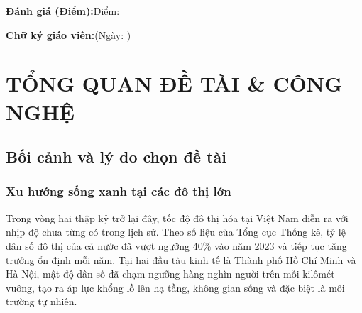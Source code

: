 \documentclass[11pt, a4paper]{article}
\let\oldsection\section
\renewcommand{\section}{\FloatBarrier\oldsection}
\begin{document}
\noindent\dotfill

\noindent\dotfill

\noindent\dotfill

\noindent\dotfill

\noindent\dotfill

\noindent\dotfill

\noindent\dotfill

\vspace{1cm}

\noindent\textbf{Đánh giá (Điểm):}\hspace{2cm}Điểm:\hspace{1cm}\dotfill

\vspace{0.5cm}

\noindent\textbf{Chữ ký giáo viên:}\hspace{2cm}\dotfill\hspace{2cm}(Ngày: \dotfill)

\clearpage

\renewcommand{\contentsname}{MỤC LỤC}
\tableofcontents

\clearpage

\section{TỔNG QUAN ĐỀ TÀI \& CÔNG NGHỆ}

\subsection{Bối cảnh và lý do chọn đề tài}

\subsubsection{Xu hướng sống xanh tại các đô thị lớn}

Trong vòng hai thập kỷ trở lại đây, tốc độ đô thị hóa tại Việt Nam diễn ra với nhịp độ chưa từng có trong lịch sử. Theo số liệu của Tổng cục Thống kê, tỷ lệ dân số đô thị của cả nước đã vượt ngưỡng 40\% vào năm 2023 và tiếp tục tăng trưởng ổn định mỗi năm. Tại hai đầu tàu kinh tế là Thành phố Hồ Chí Minh và Hà Nội, mật độ dân số đã chạm ngưỡng hàng nghìn người trên mỗi kilômét vuông, tạo ra áp lực khổng lồ lên hạ tầng, không gian sống và đặc biệt là môi trường tự nhiên.
\end{document}
